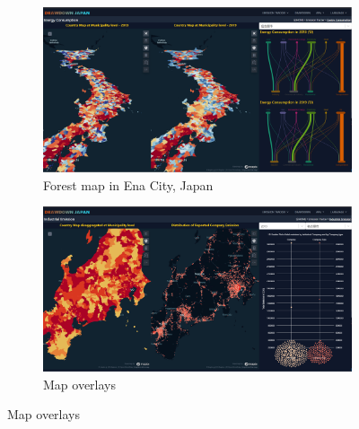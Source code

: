 \begin{figure}[p]
  \begin{subfigure}{.5\textwidth}
      \centering
      \includegraphics[width=.9\textwidth]{figs/chap7/ems_consumption.png}
      \caption{Forest map in Ena City, Japan}
  \end{subfigure}%
  \begin{subfigure}{.5\textwidth}
      \centering
      \includegraphics[width=.9\textwidth]{figs/chap7/industrial_ems.png}
      \caption{Map overlays}
  \end{subfigure}


\end{figure}
